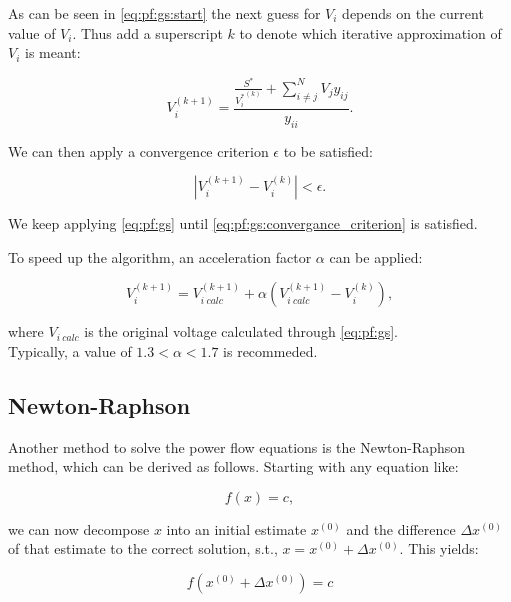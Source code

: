 As can be seen in \autoref{eq:pf:gs:start} the next guess for $V_i$
depends on the current value of $V_i$. Thus add a superscript $k$
to denote which iterative approximation of $V_i$ is meant:

\begin{equation}
    V_i^{(k+1)} = \frac{\frac{S^*}{{V_i^*}^{(k)}} + \sum_{i \ne j}^N V_j y_{ij}}{y_{ii}}.
    \label{eq:pf:gs}
\end{equation}

We can then apply a convergence criterion $\epsilon$ to be satisfied:

\begin{equation}
    |V_i^{(k+1)} - V_i^{(k)}| < \epsilon.
    \label{eq:pf:gs:convergance_criterion}
\end{equation}

We keep applying \autoref{eq:pf:gs} until \autoref{eq:pf:gs:convergance_criterion}
is satisfied.

To speed up the algorithm, an acceleration factor $\alpha$ can be applied:

\begin{equation}
    V_{i}^{(k+1)} = V_{i \ calc}^{(k + 1)} + \alpha(V_{i \ calc}^{(k + 1)} - V_{i}^{(k)}),
    \label{eq:pf:gs:acc}
\end{equation}

where $V_{i \ calc}$ is the original voltage calculated through \autoref{eq:pf:gs}.\\
Typically, a value of $1.3 < \alpha < 1.7$ is recommeded\autocite{power_system_analysis}.

\subsection{Newton-Raphson}

Another method to solve the power flow equations is
the Newton-Raphson method, which can be derived as follows.
Starting with any equation like:

\begin{equation}
    f(x) = c,
    \label{eq:pf:nr_start_point}
\end{equation}

we can now decompose $x$ into an initial estimate $x^{(0)}$ 
and the difference $\Delta x^{(0)}$ of that estimate to the correct solution, s.t.,
$x = x^{(0)} + \Delta x^{(0)}$. This yields:

\begin{equation}
    f(x^{(0)} + \Delta x^{(0)}) = c
\end{equation}

